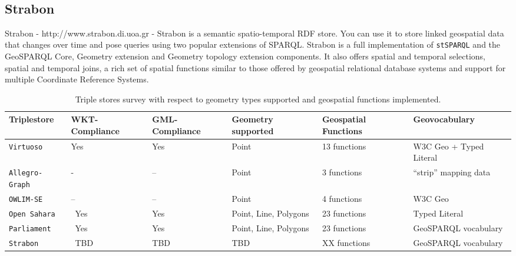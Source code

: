 \begin{itemize}
 \\

\subsection{Strabon}
Strabon - http://www.strabon.di.uoa.gr - Strabon is a semantic spatio-temporal RDF store. You can use it to store linked geospatial data that changes over time and pose queries using two popular extensions of SPARQL. Strabon is a full implementation of \texttt{stSPARQL} and the GeoSPARQL Core, Geometry extension and Geometry topology extension components. It also offers spatial and temporal selections, spatial and temporal joins, a rich set of spatial functions similar to those offered by geospatial relational database systems and support for multiple Coordinate Reference Systems.

\begin{table}[ht!]
    \caption{Triple stores survey with respect to geometry types supported and geospatial functions implemented.} \label{tab:triplestore}
    \small
    \center
     \begin{tabular}{@{}  l  l  l @{}}
    \toprule
    \textbf{Triplestore} 		& \textbf{WKT-Compliance } &  \textbf{GML-Compliance } & \textbf{Geometry supported} & \textbf{Geospatial Functions} &  \textbf{Geovocabulary }\\
    \toprule
    \texttt{Virtuoso} 	& Yes & Yes & Point & 13 functions & W3C Geo + Typed Literal\\
    \midrule
    \texttt{Allegro-Graph} & \-- & -- & Point & 3 functions & ``strip'' mapping data \\
    \midrule
    \texttt{OWLIM-SE} & -- & -- & Point & 4 functions & W3C Geo\\ 
    \midrule
    \texttt{Open Sahara} & \ Yes & Yes & Point, Line, Polygons & 23 functions  & Typed Literal \\
    \midrule
    \texttt{Parliament} & \ Yes & Yes & Point, Line, Polygons & 23 functions  &  GeoSPARQL vocabulary\\
    \midrule
    \texttt{Strabon} & \ TBD & TBD & TBD & XX functions  &  GeoSPARQL vocabulary\\
    \bottomrule
  
     \end{tabular}
    \end{table}
    

\end{itemize}
